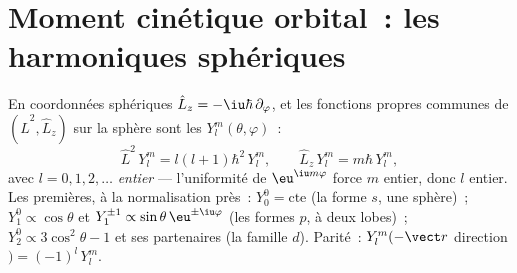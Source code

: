\section{Moment cinétique orbital~: les harmoniques sphériques}

\begin{proposition}\label{prop:b3:quantum-angular-momentum:harmonics}
En coordonnées sphériques $\hat L_z = -\iu\hbar\,\partial_\varphi$, et
les fonctions propres communes de $(\hat L^2, \hat L_z)$ sur la sphère
sont les \emph{} $Y_l^m(\theta, \varphi)$~:
\[
\hat L^2\,Y_l^m = l(l+1)\hbar^2\,Y_l^m , \qquad
\hat L_z\,Y_l^m = m\hbar\,Y_l^m ,
\]
avec $l = 0, 1, 2, \dots$ \emph{entier} --- l'uniformité de
$\eu^{\iu m\varphi}$ force $m$ entier, donc $l$ entier. Les premières,
à la normalisation près~: $Y_0^0 = \text{cte}$ (la forme $s$, une
sphère)~; $Y_1^0 \propto \cos\theta$ et $Y_1^{\pm1}
\propto \sin\theta\,\eu^{\pm\iu\varphi}$ (les formes $p$, à deux
lobes)~; $Y_2^0 \propto 3\cos^2\theta - 1$ et ses partenaires (la
famille $d$). Parité~: $Y_l^m(-\vect r$ direction$) = (-1)^l\,Y_l^m$.
\end{proposition}
\admitted

